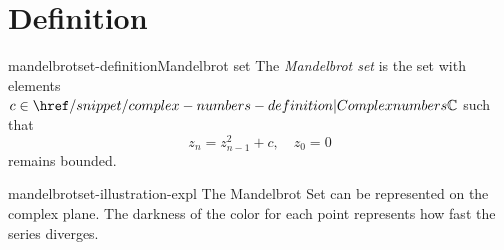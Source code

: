 \documentclass[preview]{standalone}
\begin{document}
\genpage

\section{Definition}

\begin{snippetdefinition}{mandelbrotset-definition}{Mandelbrot set}
    The \textit{Mandelbrot set} is the set with elements \(c \in \complexnumbers\) such that
    \[
        z_n = z_{n-1}^2 + c,\quad z_0=0
    \]
    remains bounded.
\end{snippetdefinition}

\begin{snippet}{mandelbrotset-illustration-expl}
    The Mandelbrot Set can be represented on the complex plane.
    The darkness of the color for each point
    represents how fast the series diverges.
\end{snippet}

\end{document}
